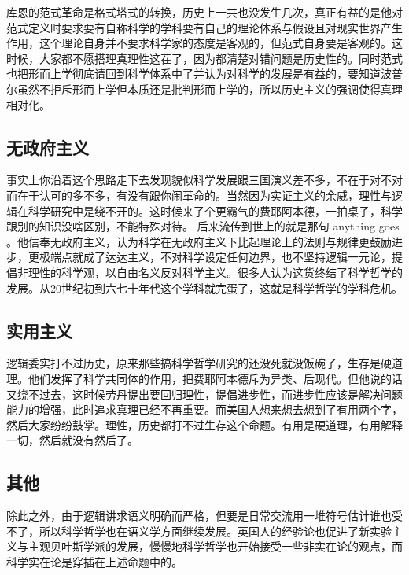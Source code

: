 \documentclass[]{tufte-book}
\begin{document}
库恩的范式革命是格式塔式的转换，历史上一共也没发生几次，真正有益的是他对范式定义时要求要有自称科学的学科要有自己的理论体系与假设且对现实世界产生作用，这个理论自身并不要求科学家的态度是客观的，但范式自身要是客观的。这时候，大家都不愿搭理真理性这茬了，因为都清楚对错问题是历史性的。同时范式也把形而上学彻底请回到科学体系中了并认为对科学的发展是有益的，要知道波普尔虽然不拒斥形而上学但本质还是批判形而上学的，所以历史主义的强调使得真理相对化。

\hypertarget{ux65e0ux653fux5e9cux4e3bux4e49}{%
\subsection{无政府主义}\label{ux65e0ux653fux5e9cux4e3bux4e49}}

事实上你沿着这个思路走下去发现貌似科学发展跟三国演义差不多，不在于对不对而在于认可的多不多，有没有跟你闹革命的。当然因为实证主义的余威，理性与逻辑在科学研究中是绕不开的。这时候来了个更霸气的费耶阿本德，一拍桌子，科学跟别的知识没啥区别，不能特殊对待。 后来流传到世上的就是那句 anything goes 。他信奉无政府主义，认为科学在无政府主义下比起理论上的法则与规律更鼓励进步，更极端点就成了达达主义，不对科学设定任何边界，也不坚持逻辑一元论，提倡非理性的科学观，以自由名义反对科学主义。很多人认为这货终结了科学哲学的发展。从20世纪初到六七十年代这个学科就完蛋了，这就是科学哲学的学科危机。

\hypertarget{ux5b9eux7528ux4e3bux4e49}{%
\subsection{实用主义}\label{ux5b9eux7528ux4e3bux4e49}}

逻辑委实打不过历史，原来那些搞科学哲学研究的还没死就没饭碗了，生存是硬道理。他们发挥了科学共同体的作用，把费耶阿本德斥为异类、后现代。但他说的话又绕不过去，这时候劳丹提出要回归理性，提倡进步性，而进步性应该是解决问题能力的增强，此时追求真理已经不再重要。而美国人想来想去想到了有用两个字，然后大家纷纷鼓掌。理性，历史都打不过生存这个命题。有用是硬道理，有用解释一切，然后就没有然后了。

\hypertarget{ux5176ux4ed6}{%
\subsection{其他}\label{ux5176ux4ed6}}

除此之外，由于逻辑讲求语义明确而严格，但要是日常交流用一堆符号估计谁也受不了，所以科学哲学也在语义学方面继续发展。英国人的经验论也促进了新实验主义与主观贝叶斯学派的发展，慢慢地科学哲学也开始接受一些非实在论的观点，而科学实在论是穿插在上述命题中的。
\end{document}
